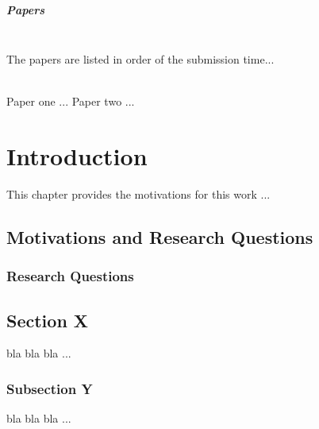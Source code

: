 \paragraph{{\Large Papers}}\mbox{}\\
The papers are listed in order of the submission time...

\mbox{}\\

\leavevmode{}  Paper one ...  
\leavevmode{}  Paper two ...  




    \setcounter{secnumdepth}{3}
    \setcounter{tocdepth}{3}
    \tableofcontents


    \mainmatter


    \cleardoublepage
    

\chapter{Introduction}
\label{chap:Introduction}

This chapter provides the motivations for this work ...



\section{Motivations and Research Questions}
\label{sec:MotivAndQ}



\subsection{Research Questions}
\label{sec:RQ}




\section{Section X}
\label{sec:X}
bla bla bla ...
\subsection{Subsection Y}
bla bla bla ...

